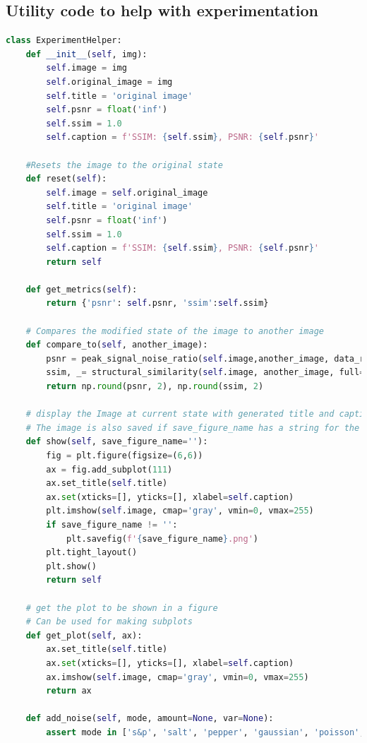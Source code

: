 \documentclass[a4paper, english]{article}
\begin{document}
\subsection{Utility code to help with experimentation}
\begin{lstlisting}[language=Python, caption=Class to streamline the experimentation process, label=experimentation_code]
class ExperimentHelper:
    def __init__(self, img):
        self.image = img
        self.original_image = img
        self.title = 'original image'
        self.psnr = float('inf')
        self.ssim = 1.0
        self.caption = f'SSIM: {self.ssim}, PSNR: {self.psnr}'
    
    #Resets the image to the original state
    def reset(self):
        self.image = self.original_image
        self.title = 'original image'
        self.psnr = float('inf')
        self.ssim = 1.0
        self.caption = f'SSIM: {self.ssim}, PSNR: {self.psnr}'
        return self

    def get_metrics(self):
        return {'psnr': self.psnr, 'ssim':self.ssim}
    
    # Compares the modified state of the image to another image
    def compare_to(self, another_image):
        psnr = peak_signal_noise_ratio(self.image,another_image, data_range=255)
        ssim, _= structural_similarity(self.image, another_image, full=True)
        return np.round(psnr, 2), np.round(ssim, 2)
    
    # display the Image at current state with generated title and caption
    # The image is also saved if save_figure_name has a string for the name
    def show(self, save_figure_name=''):
        fig = plt.figure(figsize=(6,6))
        ax = fig.add_subplot(111)
        ax.set_title(self.title)
        ax.set(xticks=[], yticks=[], xlabel=self.caption)
        plt.imshow(self.image, cmap='gray', vmin=0, vmax=255)
        if save_figure_name != '':
            plt.savefig(f'{save_figure_name}.png')
        plt.tight_layout()
        plt.show()
        return self

    # get the plot to be shown in a figure
    # Can be used for making subplots
    def get_plot(self, ax):
        ax.set_title(self.title)
        ax.set(xticks=[], yticks=[], xlabel=self.caption)
        ax.imshow(self.image, cmap='gray', vmin=0, vmax=255)
        return ax

    def add_noise(self, mode, amount=None, var=None):
        assert mode in ['s&p', 'salt', 'pepper', 'gaussian', 'poisson', 'speckle']


\end{lstlisting}
\end{document}
